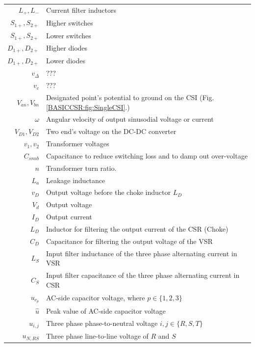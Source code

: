 \begin{longtable}{r l}
	$L_+,L_-$													& Current filter inductors\\
	$S_{1+},S_{2+}$										& Higher switches\\
	$S_{1+},S_{2+}$										& Lower switches\\
	$D_{1+},D_{2+}$										& Higher diodes\\
	$D_{1+},D_{2+}$										& Lower diodes\\
	$v_\Delta$												& ???\\
	$v_c$															& ???\\
	$V_{an},V_{bn}$  									& Designated point's potential to ground on the CSI (Fig.\ref{BASICCSR:fig:SingleCSI}.)\\
	$\omega$													& Angular velocity of output sinusodial voltage or current\\
	$V_{D1},V_{D2}$ 									& Two end's voltage on the DC-DC converter\\
	$v_1,v_2$                         & Transformer voltages\\
	$C_{snub}$ 												& Capacitance to reduce switching loss and to damp out over-voltage\\
	$n$ 															& Transformer turn ratio.\\
	$L_a$															& Leakage inductance\\
	$v_D$															& Output voltage before the choke inductor $L_D$\\
	$V_d$															& Output voltage\\
	$I_D$															& Output current\\
	$L_D$															& Inductor for filtering the output current of the CSR (Choke)\\ 
	$C_D$															& Capacitance for filtering the output voltage of the VSR\\ 
	$L_S$															& Input filter inductance of the three phase alternating current in VSR\\
	$C_S$															& Input filter capacitance of the three phase alternating current in CSR\\
	$u_{c_p}$													& AC-side capacitor voltage, where $p\in\{1,2,3\}$\\
	$\widehat{u}$											& Peak value of AC-side capacitor voltage\\
	$u_{i,j}$													& Three phase phase-to-neutral voltage $i,j\in\{R,S,T\}$\\
	$u_{N,RS}$												& Three phase line-to-line voltage of $R$ and $S$\\

\end{longtable}
